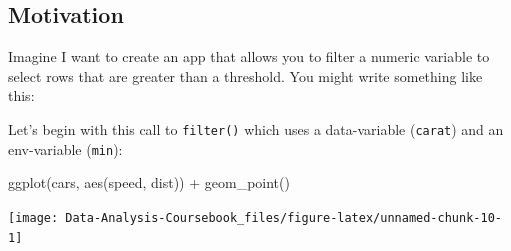 \documentclass[
]{article}
\newenvironment{Shaded}{\begin{snugshade}}{\end{snugshade}}
\newcommand{\FunctionTok}[1]{\textcolor[rgb]{0.00,0.00,0.00}{#1}}
\newcommand{\NormalTok}[1]{#1}
\newcommand{\SpecialCharTok}[1]{\textcolor[rgb]{0.00,0.00,0.00}{#1}}
\begin{document}
\hypertarget{tidy-motivation}{%
\subsection{Motivation}\label{tidy-motivation}}

Imagine I want to create an app that allows you to filter a numeric variable to select rows that are greater than a threshold.
You might write something like this:

Let's begin with this call to \texttt{filter()} which uses a data-variable (\texttt{carat}) and an env-variable (\texttt{min}):

\begin{Shaded}
\begin{Highlighting}[]
\FunctionTok{ggplot}\NormalTok{(cars, }\FunctionTok{aes}\NormalTok{(speed, dist)) }\SpecialCharTok{+} 
  \FunctionTok{geom\_point}\NormalTok{()}
\end{Highlighting}
\end{Shaded}

\begin{center}\texttt{[image: Data-Analysis-Coursebook\_files/figure-latex/unnamed-chunk-10-1]} \end{center}

  
\end{document}
